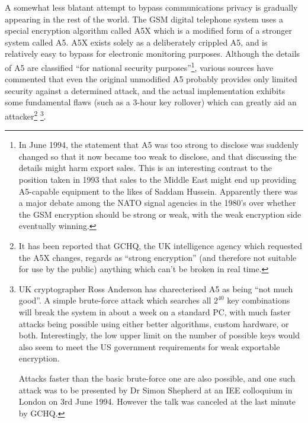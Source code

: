 A somewhat less blatant attempt to bypass communications privacy is gradually
appearing in the rest of the world.  The GSM digital telephone system uses a
special encryption algorithm called A5X which is a modified form of a stronger
system called A5.  A5X exists solely as a deliberately crippled A5, and is
relatively easy to bypass for electronic monitoring purposes.  Although the
details of A5 are classified ``for national security purposes''\footnote{
                In June 1994, the statement that A5 was too strong to disclose
                was suddenly changed so that it now became too weak to disclose,
                and that discussing the details might harm export sales.  This
                is an interesting contrast to the position taken in 1993 that
                sales to the Middle East might end up providing A5-capable
                equipment to the likes of Saddam Hussein.  Apparently there was
                a major debate among the NATO signal agencies in the 1980's over
                whether the GSM encryption should be strong or weak, with the
                weak encryption side eventually winning.
}, various 
sources have commented that even the original unmodified A5 probably provides 
only limited security against a determined attack, and the actual 
implementation exhibits some fundamental flaws (such as a 3-hour key rollover) 
which can greatly aid an attacker\footnote{
		It has been reported that GCHQ, the UK intelligence agency which
              	requested the A5X changes, regards as ``strong encryption'' (and
              	therefore not suitable for use by the public) anything which
              	can't be broken in real time.
} \footnote{
                UK cryptographer Ross Anderson has charecterised A5 as being
                ``not much good''.  A simple brute-force attack which searches all
                $2^{40}$ key combinations will break the system in about a week on a
                standard PC, with much faster attacks being possible using
                either better algorithms, custom hardware, or both.
                Interestingly, the low upper limit on the number of possible
                keys would also seem to meet the US government requirements for
                weak exportable encryption.
 
                Attacks faster than the basic brute-force one are also possible,
                and one such attack was to be presented by Dr Simon Shepherd at
                an IEE colloquium in London on 3rd June 1994.  However the talk
                was canceled at the last minute by GCHQ.
}.

